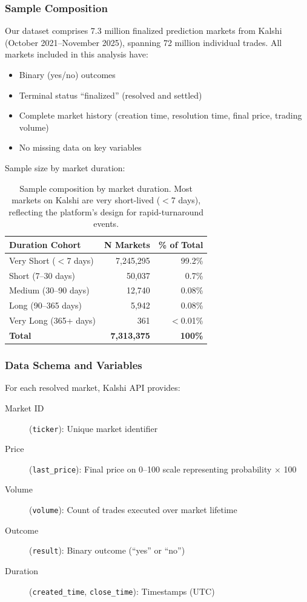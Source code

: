 \documentclass[a4paper,11pt]{article}
\theoremstyle{plain}
\theoremstyle{definition}
\theoremstyle{remark}
\begin{document}
\subsubsection{Sample Composition}

Our dataset comprises 7.3 million finalized prediction markets from Kalshi (October 2021--November 2025), spanning 72 million individual trades. All markets included in this analysis have:

\begin{itemize}
    \item Binary (yes/no) outcomes
    \item Terminal status ``finalized'' (resolved and settled)
    \item Complete market history (creation time, resolution time, final price, trading volume)
    \item No missing data on key variables
\end{itemize}

Sample size by market duration:
\begin{table}[h]
\centering
\begin{tabular}{lrr}
\toprule
\textbf{Duration Cohort} & \textbf{N Markets} & \textbf{\% of Total} \\
\midrule
Very Short ($<$7 days) & 7,245,295 & 99.2\% \\
Short (7--30 days) & 50,037 & 0.7\% \\
Medium (30--90 days) & 12,740 & 0.08\% \\
Long (90--365 days) & 5,942 & 0.08\% \\
Very Long (365+ days) & 361 & $<$0.01\% \\
\midrule
\textbf{Total} & \textbf{7,313,375} & \textbf{100\%} \\
\bottomrule
\end{tabular}
\caption{Sample composition by market duration. Most markets on Kalshi are very short-lived ($<$7 days), reflecting the platform's design for rapid-turnaround events.}
\label{tab:duration}
\end{table}

\subsubsection{Data Schema and Variables}

For each resolved market, Kalshi API provides:

\begin{description}
    \item[Market ID] (\texttt{ticker}): Unique market identifier
    \item[Price] (\texttt{last\_price}): Final price on 0--100 scale representing probability $\times$ 100
    \item[Volume] (\texttt{volume}): Count of trades executed over market lifetime
    \item[Outcome] (\texttt{result}): Binary outcome (``yes'' or ``no'')
    \item[Duration] (\texttt{created\_time}, \texttt{close\_time}): Timestamps (UTC)
\end{description}
\end{document}
